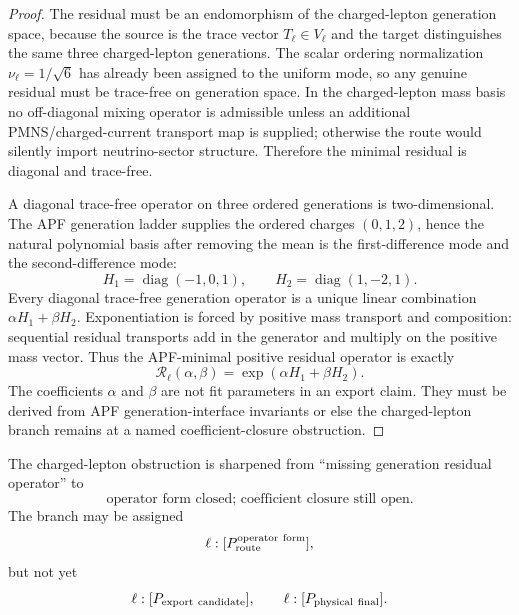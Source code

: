 \begin{proof}
The residual must be an endomorphism of the charged-lepton generation space, because the source is the trace vector \(T_\ell\in V_\ell\) and the target distinguishes the same three charged-lepton generations.  The scalar ordering normalization \(\nu_\ell=1/\sqrt6\) has already been assigned to the uniform mode, so any genuine residual must be trace-free on generation space.  In the charged-lepton mass basis no off-diagonal mixing operator is admissible unless an additional PMNS/charged-current transport map is supplied; otherwise the route would silently import neutrino-sector structure.  Therefore the minimal residual is diagonal and trace-free.

A diagonal trace-free operator on three ordered generations is two-dimensional.  The APF generation ladder supplies the ordered charges \((0,1,2)\), hence the natural polynomial basis after removing the mean is the first-difference mode and the second-difference mode:
\[
        H_1=\operatorname{diag}(-1,0,1),
        \qquad
        H_2=\operatorname{diag}(1,-2,1).
\]
Every diagonal trace-free generation operator is a unique linear combination \(\alpha H_1+\beta H_2\).  Exponentiation is forced by positive mass transport and composition: sequential residual transports add in the generator and multiply on the positive mass vector.  Thus the APF-minimal positive residual operator is exactly
\[
        \mathcal R_\ell(\alpha,\beta)=\exp(\alpha H_1+\beta H_2).
\]
The coefficients \(\alpha\) and \(\beta\) are not fit parameters in an export claim.  They must be derived from APF generation-interface invariants or else the charged-lepton branch remains at a named coefficient-closure obstruction. \qedhere
\end{proof}

\begin{corollary}
The charged-lepton obstruction is sharpened from ``missing generation residual operator'' to
\[
        \boxed{\text{operator form closed; coefficient closure still open}.}
\]
The branch may be assigned
\[
        \ell:[P_{\rm route}^{\rm operator\ form}],
\]
but not yet
\[
        \ell:[P_{\rm export\ candidate}],
        \qquad
        \ell:[P_{\rm physical\ final}].
\]
\end{corollary}


